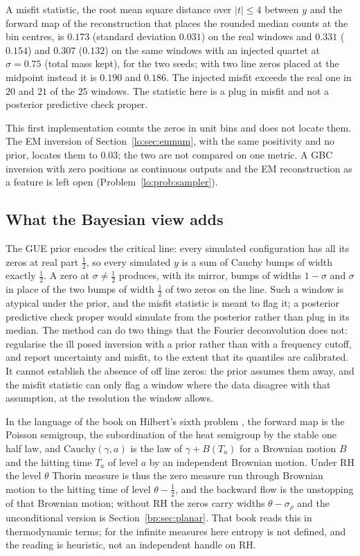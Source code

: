 A misfit statistic, the root mean square distance over $|t|\le4$ between $y$ and the forward map of the reconstruction that places the rounded median counts at the bin centres, is $0.173$ (standard deviation $0.031$) on the real windows and $0.331$ ($0.154$) and $0.307$ ($0.132$) on the same windows with an injected quartet at $\sigma=0.75$ (total mass kept), for the two seeds; with two line zeros placed at the midpoint instead it is $0.190$ and $0.186$. The injected misfit exceeds the real one in $20$ and $21$ of the $25$ windows. The statistic here is a plug in misfit and not a posterior predictive check proper.

This first implementation counts the zeros in unit bins and does not locate them. The EM inversion of Section~\ref{lo:sec:emnum}, with the same positivity and no prior, locates them to $0.03$; the two are not compared on one metric. A GBC inversion with zero positions as continuous outputs and the EM reconstruction as a feature is left open (Problem~\ref{lo:prob:sampler}).

\subsection{What the Bayesian view adds}

The GUE prior encodes the critical line: every simulated configuration has all its zeros at real part $\tfrac12$, so every simulated $y$ is a sum of Cauchy bumps of width exactly $\tfrac12$. A zero at $\sigma\ne\tfrac12$ produces, with its mirror, bumps of widths $1-\sigma$ and $\sigma$ in place of the two bumps of width $\tfrac12$ of two zeros on the line. Such a window is atypical under the prior, and the misfit statistic is meant to flag it; a posterior predictive check proper would simulate from the posterior rather than plug in its median. The method can do two things that the Fourier deconvolution does not: regularise the ill posed inversion with a prior rather than with a frequency cutoff, and report uncertainty and misfit, to the extent that its quantiles are calibrated. It cannot establish the absence of off line zeros: the prior assumes them away, and the misfit statistic can only flag a window where the data disagree with that assumption, at the resolution the window allows.

In the language of the book on Hilbert's sixth problem \cite{PSH626}, the forward map is the Poisson semigroup, the subordination of the heat semigroup by the stable one half law, and $\mathrm{Cauchy}(\gamma,a)$ is the law of $\gamma+B(T_a)$ for a Brownian motion $B$ and the hitting time $T_a$ of level $a$ by an independent Brownian motion. Under RH the level $\theta$ Thorin measure is thus the zero measure run through Brownian motion to the hitting time of level $\theta-\tfrac12$, and the backward flow is the unstopping of that Brownian motion; without RH the zeros carry widths $\theta-\sigma_\rho$ and the unconditional version is Section~\ref{bp:sec:planar}. That book reads this in thermodynamic terms; for the infinite measures here entropy is not defined, and the reading is heuristic, not an independent handle on RH.
